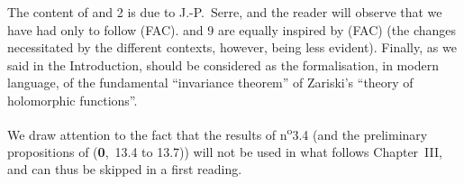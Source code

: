 The content of \textsection{} and 2 is due to J.-P.~Serre, and the reader will observe that we have had only to follow (FAC).
 and 9 are equally inspired by (FAC) (the changes necessitated by the different contexts, however, being less evident).
Finally, as we said in the Introduction,  should be considered as the formalisation, in modern language, of the fundamental ``invariance theorem'' of Zariski's ``theory of holomorphic functions''.

We draw attention to the fact that the results of n\textsuperscript{o}3.4 (and the preliminary propositions of (\textbf{0},~13.4 to 13.7)) will not be used in what follows Chapter~III, and can thus be skipped in a first reading.
\bigskip














